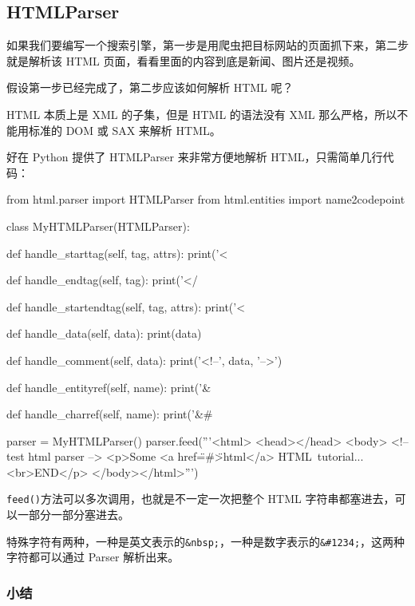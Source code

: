 \hypertarget{htmlparser}{%
\subsection{HTMLParser}\label{htmlparser}}

如果我们要编写一个搜索引擎，第一步是用爬虫把目标网站的页面抓下来，第二步就是解析该
HTML 页面，看看里面的内容到底是新闻、图片还是视频。

假设第一步已经完成了，第二步应该如何解析 HTML 呢？

HTML 本质上是 XML 的子集，但是 HTML 的语法没有 XML
那么严格，所以不能用标准的 DOM 或 SAX 来解析 HTML。

好在 Python 提供了 HTMLParser 来非常方便地解析 HTML，只需简单几行代码：

\begin{pythoncode}
from html.parser import HTMLParser
from html.entities import name2codepoint

class MyHTMLParser(HTMLParser):

    def handle_starttag(self, tag, attrs):
        print('<%

    def handle_endtag(self, tag):
        print('</%

    def handle_startendtag(self, tag, attrs):
        print('<%

    def handle_data(self, data):
        print(data)

    def handle_comment(self, data):
        print('<!--', data, '-->')

    def handle_entityref(self, name):
        print('&%

    def handle_charref(self, name):
        print('&#%

parser = MyHTMLParser()
parser.feed('''<html>
<head></head>
<body>
<!-- test html parser -->
    <p>Some <a href=\"#\">html</a> HTML tutorial...<br>END</p>
</body></html>''')
\end{pythoncode}

\texttt{feed()}方法可以多次调用，也就是不一定一次把整个 HTML
字符串都塞进去，可以一部分一部分塞进去。

特殊字符有两种，一种是英文表示的\texttt{\&nbsp;}，一种是数字表示的\texttt{\&\#1234;}，这两种字符都可以通过
Parser 解析出来。

\hypertarget{ux5c0fux7ed3}{%
\subsubsection{小结}\label{ux5c0fux7ed3}}

